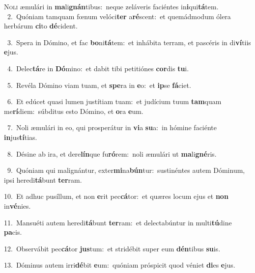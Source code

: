 \lettrine{\initial\textcolor{\initialcolor}{N}}{oli} æmulári in \textbf{ma}\-li\-\textbf{gnán}\-tibus:~\star neque zeláveris faciéntes in\-\textbf{i}\-qui\-\textbf{tá}\-tem.\\
{\numbfont\textcolor{\numbcolor}{~2.}}~Quóniam tamquam fœnum velóci\textbf{ter} a\-\textbf{ré}\-scent:~\star et quemádmodum ólera herbárum \textbf{ci}\-to \textbf{dé}\-cident.\par
{\numbfont\textcolor{\numbcolor}{~3.}}~Spera in Dómino, et fac \textbf{bo}\-ni\-\textbf{tá}\-tem:~\star et inhábita terram, et pascéris in di\-\textbf{ví}\-tiis \textbf{e}\-jus.\par
{\numbfont\textcolor{\numbcolor}{~4.}}~Delec\-\textbf{tá}\-re in \textbf{Dó}\-mino:~\star et dabit tibi petitiónes \textbf{cor}\-dis \textbf{tu}\-i.\par
{\numbfont\textcolor{\numbcolor}{~5.}}~Revéla Dómino viam tuam, et \textbf{spe}\-ra in \textbf{e}\-o:~\star et \textbf{ip}\-se \textbf{fá}\-ciet.\par
{\numbfont\textcolor{\numbcolor}{~6.}}~Et edúcet quasi lumen justítiam tuam:~\dagger et judícium tuum \textbf{tam}\-quam me\-\textbf{rí}\-diem:~\star súbditus esto Dómino, et \textbf{o}\-ra \textbf{e}\-um.\par
{\numbfont\textcolor{\numbcolor}{~7.}}~Noli æmulári in eo, qui prosperátur in \textbf{vi}\-a \textbf{su}\-a:~\star in hómine faciénte \textbf{in}\-jus\-\textbf{tí}\-tias.\par
{\numbfont\textcolor{\numbcolor}{~8.}}~Désine ab ira, et dere\-\textbf{lín}\-que fu\-\textbf{ró}\-rem:~\star noli æmulári ut \textbf{ma}\-li\-\textbf{gné}\-ris.\par
{\numbfont\textcolor{\numbcolor}{~9.}}~Quóniam qui malignántur, exter\-\textbf{mi}\-na\-\textbf{bún}\-tur:~\star sustinéntes autem Dóminum, ipsi heredi\-\textbf{tá}\-bunt \textbf{ter}\-ram.\par
{\numbfont\textcolor{\numbcolor}{10.}}~Et adhuc pusíllum, et non \textbf{e}\-rit pec\-\textbf{cá}\-tor:~\star et quæres locum ejus et \textbf{non} in\-\textbf{vé}\-nies.\par
{\numbfont\textcolor{\numbcolor}{11.}}~Mansuéti autem heredi\-\textbf{tá}\-bunt \textbf{ter}\-ram:~\star et delectabúntur in multi\-\textbf{tú}\-dine \textbf{pa}\-cis.\par
{\numbfont\textcolor{\numbcolor}{12.}}~Observábit pec\-\textbf{cá}\-tor \textbf{jus}\-tum:~\star et stridébit super eum \textbf{dén}\-tibus \textbf{su}\-is.\par
{\numbfont\textcolor{\numbcolor}{13.}}~Dóminus autem irri\-\textbf{dé}\-bit \textbf{e}\-um:~\star quóniam próspicit quod véniet \textbf{di}\-es \textbf{e}\-jus.\par
